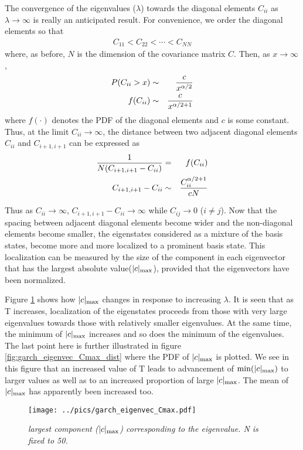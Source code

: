 \documentclass{report}
\begin{document}
The convergence of the eigenvalues ($\lambda$) towards the diagonal
elements $C_{ii}$ as $\lambda \to \infty$ is really an anticipated
result. For convenience, we order the diagonal elements so that
\begin{eqnarray*}
  C_{11} < C_{22} < \cdots < C_{NN}
\end{eqnarray*}
where, as before, $N$ is the dimension of the covariance matrix
$C$. Then, as $x \to \infty$,
\begin{eqnarray*}
  P(C_{ii} > x) &\sim& {c \over x^{\alpha/2}} \\
  f(C_{ii}) &\sim& {c \over x^{\alpha/2 + 1}} \\
\end{eqnarray*}
where $f(\cdot)$ denotes the PDF of the diagonal elements and $c$ is
some constant. Thus, at the limit $C_{ii} \to \infty$, the distance
between two adjacent diagonal elements $C_{ii}$ and $C_{i+1, i+1}$ can
be expressed as
\begin{eqnarray*}
{1 \over N (C_{i+1, i+1} - C_{ii})} &=& f(C_{ii})\\
C_{i+1, i+1} - C_{ii} &\sim& {C_{ii}^{\alpha/2 + 1} \over c N}
\end{eqnarray*}

Thus as $C_{ii} \to \infty$, $C_{i+1, i+1} - C_{ii} \to \infty$ while
$C_{ij} \to 0$ ($i \neq j$). Now that the spacing between adjacent
diagonal elements become wider and the non-diagonal elements become
smaller, the eigenstates considered as a mixture of the basis states,
become more and more localized to a prominent basis state. This
localization can be measured by the size of the component in each
eigenvector that has the largest absolute value($|c|_{\text{max}}$), provided
that the eigenvectors have been normalized.

Figure \ref{fig:garch_eigenvec_Cmax} shows how $|c|_{\text{max}}$ changes
in response to increasing $\lambda$. It is seen that as T increases,
localization of the eigenstates proceeds from those with very
large eigenvalues towards those with relatively smaller
eigenvalues. At the same time, the minimum of $|c|_{\text{max}}$ increases
and so does the minimum of the eigenvalues. The last point here is
further illustrated in figure \ref{fig:garch_eigenvec_Cmax_dist} where
the PDF of $|c|_{\text{max}}$ is plotted. We see in this figure that an
increased value of T leads to advancement of $\min(|c|_{\text{max}})$ to larger
values as well as to an increased proportion of large $|c|_{\text{max}}$. The
mean of $|c|_{\text{max}}$ has apparently been increased too.
\begin{figure}[htb!]
  \centering
  \texttt{[image: ../pics/garch\_eigenvec\_Cmax.pdf]}
  \caption{\small \it largest component ($|c|_{\text{max}}$) corresponding to
    the eigenvalue. N is fixed to 50.}
  \label{fig:garch_eigenvec_Cmax}
\end{figure}
\end{document}
